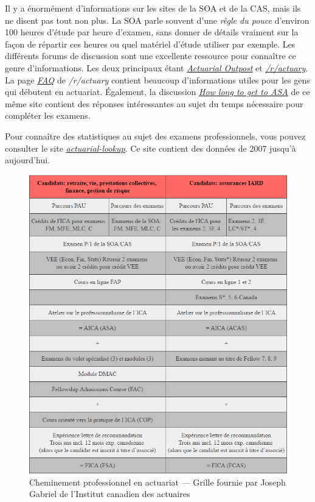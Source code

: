 Il y a énormément d'informations sur les sites de la SOA et de la CAS, mais ils ne disent pas tout non plus. La SOA parle souvent  d'une \emph{règle du pouce} d'environ 100 heures d'étude par heure d'examen, sans donner de détails vraiment sur la façon de répartir ces heures ou quel matériel d'étude utiliser par exemple. Les différents forums de discussion sont une excellente ressource pour connaître ce genre d'informations. Les deux principaux étant \href{http://www.actuarialoutpost.com/}{\emph{Actuarial Outpost}} et \href{https://www.reddit.com/r/actuary}{\emph{/r/actuary}}. La page \href{https://www.reddit.com/r/actuary/wiki/index#wiki_the_frequently_asked_questions_.28faqs.29}{\emph{FAQ}} de \emph{/r/actuary} contient beaucoup d'informations utiles pour les gens qui débutent en actuariat. Également, la discussion \href{https://www.reddit.com/r/actuary/comments/1enzdd/how_long_to_get_to_asa_is_two_years_possible/}{\emph{How long to get to ASA}} de ce même site contient des réponses intéressantes au sujet du temps nécessaire pour compléter les examens. \vspace{\baselineskip}

Pour connaître des statistiques au sujet des examens professionnels, vous pouvez consulter le site \href{http://actuarial-lookup.com/}{\emph{actuarial-lookup}}. Ce site contient des données de 2007 jusqu'à aujourd'hui.

\begin{center}
\begin{figure}[hp]
\includegraphics[width=1\textwidth]{tableau_ICA.png}
\caption{Cheminement professionnel en actuariat --- Grille fournie par Joseph Gabriel de l'Institut canadien des actuaires}
\end{figure}
\par
\end{center}

